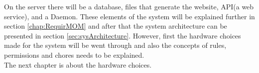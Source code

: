 On the server there will be a database, files that generate the website, API(a web service), and a Daemon. These elements of the system will be explained further in section \vref{chap:RequirMOM} and after that the system architecture can be presented in section \vref{sec:sysArchitecture}. However, first the hardware choices made for the system will be went through and also the concepts of rules, permissions and chores needs to be explained.\\
The next chapter is about the hardware choices.
